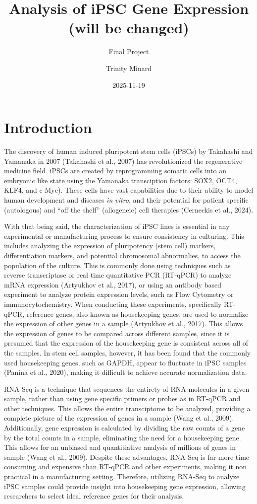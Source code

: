 \documentclass[
  letterpaper,
  DIV=11,
  numbers=noendperiod]{scrartcl}
\title{Analysis of iPSC Gene Expression (will be changed)}
\subtitle{Final Project}
\author{Trinity Minard}
\date{2025-11-19}
\begin{document}
\maketitle


\section{Introduction}\label{introduction}

The discovery of human induced pluripotent stem cells (iPSCs) by
Takahashi and Yamanaka in 2007 (Takahashi et al., 2007) has
revolutionized the regenerative medicine field. iPSCs are created by
reprogramming somatic cells into an embryonic like state using the
Yamanaka transciption factors: SOX2, OCT4, KLF4, and c-Myc). These cells
have vast capabilities due to their ability to model human development
and diseases \emph{in vitro}, and their potential for patient specific
(autologous) and ``off the shelf'' (allogeneic) cell therapies
(Cerneckis et al., 2024).

With that being said, the characterization of iPSC lines is essential in
any experimental or manufacturing process to ensure consistency in
culturing. This includes analyzing the expression of pluripotency (stem
cell) markers, differentiation markers, and potential chromosomal
abnormalies, to access the population of the culture. This is commonly
done using techniques such as reverse transcriptase or real time
quantitative PCR (RT-qPCR) to analyze mRNA expression (Artyukhov et al.,
2017), or using an antibody based experiment to analyze protein
expression levels, such as Flow Cytometry or immunocytochemistry. When
conducting these experiments, specifically RT-qPCR, reference genes,
also known as housekeeping genes, are used to normalize the expression
of other genes in a sample (Artyukhov et al., 2017). This allows the
expression of genes to be compared across different samples, since it is
presumed that the expression of the housekeeping gene is consistent
across all of the samples. In stem cell samples, however, it has been
found that the commonly used housekeeping genes, such as GAPDH, appear
to fluctuate in iPSC samples (Panina et al., 2020), making it difficult
to achieve accurate normalization data.

RNA Seq is a technique that sequences the entirety of RNA molecules in a
given sample, rather than using gene specific primers or probes as in
RT-qPCR and other techniques. This allows the entire transciptome to be
analyzed, providing a complete picture of the expression of genes in a
sample (Wang et al., 2009). Additionally, gene expression is calculated
by dividing the raw counts of a gene by the total counts in a sample,
eliminating the need for a housekeeping gene. This allows for an
unbiased and quantitiative analysis of millions of genes in sample (Wang
et al., 2009). Despite these advantages, RNA-Seq is far more time
consuming and expensive than RT-qPCR and other experiments, making it
non practical in a manufacturing setting. Therefore, utilizing RNA-Seq
to analyze iPSC samples could provide insight into housekeeping gene
expression, allowing researchers to select ideal reference genes for
their analysis.
\end{document}
